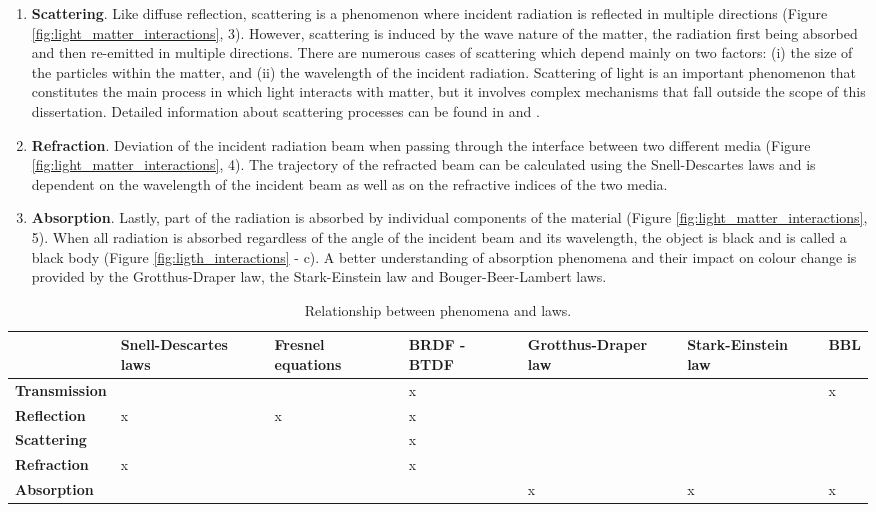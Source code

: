 \begin{enumerate}
    \item \textbf{Scattering}. Like diffuse reflection, scattering is a phenomenon where incident radiation is reflected in multiple directions (Figure \ref{fig:light_matter_interactions}, 3). However, scattering is induced by the wave nature of the matter, the radiation first being absorbed and then re-emitted in multiple directions. There are numerous cases of scattering which depend mainly on two factors: (i) the size of the particles within the matter, and (ii) the wavelength of the incident radiation. Scattering of light is an important phenomenon that constitutes the main process in which light interacts with matter, but it involves complex mechanisms that fall outside the scope of this dissertation. Detailed information about scattering processes can be found in \citet{stover_optical_1995} and \citet{huang_1_2018}.

    \item \textbf{Refraction}. Deviation of the incident radiation beam when passing through the interface between two different media (Figure \ref{fig:light_matter_interactions}, 4). The trajectory of the refracted beam can be calculated using the Snell-Descartes laws and is dependent on the wavelength of the incident beam as well as on the refractive indices of the two media.

    \item \textbf{Absorption}. Lastly, part of the radiation is absorbed by individual components of the material (Figure \ref{fig:light_matter_interactions}, 5). When all radiation is absorbed regardless of the angle of the incident beam and its wavelength, the object is black and is called a black body (Figure \ref{fig:ligth_interactions} - c). A better understanding of absorption phenomena and their impact on colour change is provided by the Grotthus-Draper law, the Stark-Einstein law and Bouger-Beer-Lambert laws.
\end{enumerate}

\begin{table*}
\centering %
\caption[\hspace{0.3cm}Phenomena and laws]{Relationship between phenomena and laws.}
\begin{tabular}{C{1.5cm}C{1.5cm}C{1.5cm}C{1.5cm}C{1.5cm}C{1.5cm}C{1cm}}
\toprule[0.4mm]
& Snell-Descartes laws & Fresnel equations & \acrshort{BRDF} - \acrshort{BTDF} & Grotthus-Draper law & Stark-Einstein law & \gls{BBL} \\\midrule
\textbf{Transmission} & & & x & & & x \\
\textbf{Reflection} & x & x & x & & & \\
\textbf{Scattering} & & & x & & & \\
\textbf{Refraction} & x & & x & & & \\
\textbf{Absorption} & & & & x & x & x \\
\bottomrule[0.4mm]
\end{tabular}
\label{tab:Lid_laws}
\end{table*}


